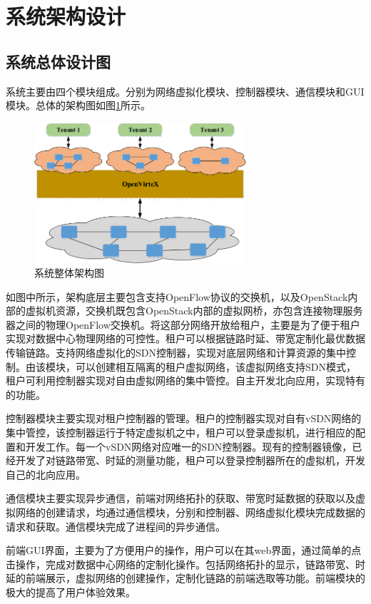 \section{系统架构设计}
\subsection{系统总体设计图}
系统主要由四个模块组成。分别为网络虚拟化模块、控制器模块、通信模块和GUI模块。总体的架构图如图\ref{fig:artic}所示。

\begin{figure}[!htb]
  \centering
  \includegraphics[width=0.7\textwidth]{logo/ovx.png}
  \caption{系统整体架构图}
  \label{fig:artic}
\end{figure}

如图中所示，架构底层主要包含支持OpenFlow协议的交换机，以及OpenStack内部的虚拟机资源，交换机既包含OpenStack内部的虚拟网桥，亦包含连接物理服务器之间的物理OpenFlow交换机。将这部分网络开放给租户，主要是为了便于租户实现对数据中心物理网络的可控性。租户可以根据链路时延、带宽定制化最优数据传输链路。支持网络虚拟化的SDN控制器，实现对底层网络和计算资源的集中控制。由该模块，可以创建相互隔离的租户虚拟网络，该虚拟网络支持SDN模式，租户可利用控制器实现对自由虚拟网络的集中管控。自主开发北向应用，实现特有的功能。

控制器模块主要实现对租户控制器的管理。租户的控制器实现对自有vSDN网络的集中管控，该控制器运行于特定虚拟机之中，租户可以登录虚拟机，进行相应的配置和开发工作。每一个vSDN网络对应唯一的SDN控制器。现有的控制器镜像，已经开发了对链路带宽、时延的测量功能，租户可以登录控制器所在的虚拟机，开发自己的北向应用。

通信模块主要实现异步通信，前端对网络拓扑的获取、带宽时延数据的获取以及虚拟网络的创建请求，均通过通信模块，分别和控制器、网络虚拟化模块完成数据的请求和获取。通信模块完成了进程间的异步通信。

前端GUI界面，主要为了方便用户的操作，用户可以在其web界面，通过简单的点击操作，完成对数据中心网络的定制化操作。包括网络拓扑的显示，链路带宽、时延的前端展示，虚拟网络的创建操作，定制化链路的前端选取等功能。前端模块的极大的提高了用户体验效果。

